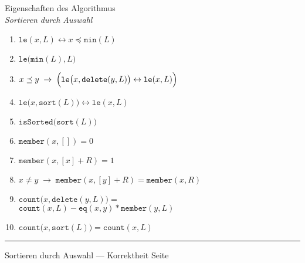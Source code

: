 \documentclass{slides}
\newcounter{mypage}
\begin{document}
\begin{slide}{}
\normalsize

\begin{center}
Eigenschaften des Algorithmus \\ \textsl{Sortieren durch Auswahl}
\end{center}
\vspace*{0.5cm}

\footnotesize
\begin{enumerate}
\item $\mathtt{le}(x, L) \leftrightarrow x \preceq \texttt{min}(L)$
\item $\mathtt{le}\bigl(\mathtt{min}(L), L\bigr)$
\item $x \preceq y \;\rightarrow\; \Bigl(\mathtt{le}\bigl(x,\mathtt{delete}(y,L)\bigr) \leftrightarrow \mathtt{le}(x, L)\Bigr)$
\item $\mathtt{le}\bigl(x, \mathtt{sort}(L)\bigr) \leftrightarrow \mathtt{le}(x, L)$
\item $\mathtt{isSorted}\bigl(\mathtt{sort}(L)\bigr)$
\item $\mathtt{member}(x,[]) = 0$
\item $\mathtt{member}(x,[x] + R) = 1$
\item $x \not= y \;\rightarrow\; \mathtt{member}(x,[y] + R) = \mathtt{member}(x,R)$
\item $\mathtt{count}\bigl(x, \mathtt{delete}(y,L)\bigr) = $ \\[0.3cm]
      \hspace*{1.3cm} $\mathtt{count}(x,L) - \mathtt{eq}(x,y)*\mathtt{member}(y,L)$
\item $\mathtt{count}\bigl(x, \mathtt{sort}(L)\bigr) = \mathtt{count}(x, L)$
\end{enumerate}

\vspace*{\fill}
\tiny \addtocounter{mypage}{1}
\rule{17cm}{1mm}
Sortieren durch Auswahl --- Korrektheit \hspace*{\fill} Seite 
\end{slide}

\end{document}
